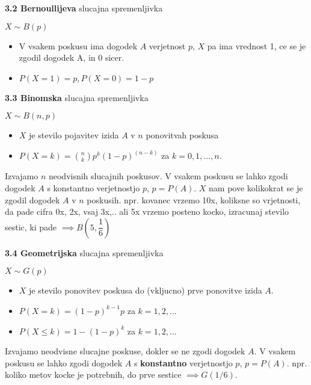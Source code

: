 \documentclass{article}
\begin{document}
\begin{multicols}{3}
\textbf{3.2 Bernoullijeva} slucajna spremenljivka
\begin{center}
    \begin{math}
        X \sim B(p)
    \end{math}
\end{center}
\begin{itemize}
    \item V vsakem poskusu ima dogodek $A$ verjetnost $p$, $X$ pa ima vrednost 1, ce se je zgodil dogodek A, in 0 sicer.
    \item $P(X = 1) = p, P(X = 0) = 1 - p$
\end{itemize}


\textbf{3.3 Binomska} slucajna spremenljivka
\begin{center}
    \begin{math}
        X \sim B(n, p)
    \end{math}
\end{center}
\begin{itemize}
    \item $X$ je stevilo pojavitev izida $A$ v $n$ ponovitvah poskusa
    \item $P(X = k) = {n \choose k} p^{k} (1 - p)^{(n - k)}$ za $k = 0,1, \dots, n.$
\end{itemize}
Izvajamo $n$ neodvisnih slucajnih poskusov. V vsakem poskusu se lahko zgodi dogodek $A$ s 
konstantno verjetnostjo $p$, $p =  P(A)$. 
$X$ nam pove kolikokrat se je zgodil dogodek $A$ v $n$ poskusih.
npr. kovanec vrzemo 10x, koliksne so vrjetnosti, da pade cifra 0x, 2x, vsaj 3x,..
ali 5x vrzemo posteno kocko, izracunaj stevilo sestic, ki pade $\implies B(5, \dfrac{1}{6})$

\textbf{3.4 Geometrijska} slucajna spremenljivka
\begin{center}
    \begin{math}
        X \sim G(p)
    \end{math}
\end{center}
\begin{itemize}
    \item $X$ je stevilo ponovitev poskusa do (vkljucno) prve ponovitve izida $A$.
    \item $P(X = k) = (1 - p)^{k - 1} p$ za $k = 1,2, \dots$ 
    \item $P(X \leq k) = 1 - (1 - p)^{k}$ za $k = 1,2, \dots$
\end{itemize}
Izvajamo  neodvisne slucajne poskuse, dokler se ne zgodi dogodek $A$. V vsakem poskusu
se lahko zgodi dogodek $A$  s \textbf{konstantno} verjetnostjo $p$, $p =  P(A)$.
npr. koliko metov kocke je potrebnih, do prve sestice $\implies G(1/6)$.


\end{multicols}
\end{document}
